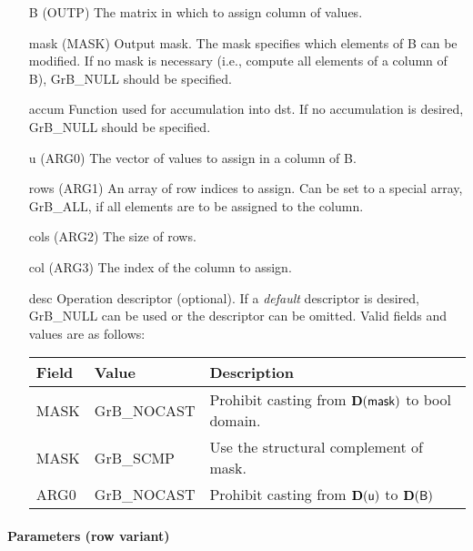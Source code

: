 \begin{itemize}[leftmargin=1.1in]
    \item[{\sf B}]   ({\sf OUTP}) The matrix in which to assign column of values.

    \item[{\sf mask}] ({\sf MASK}) Output mask. The mask specifies which elements
    of {\sf B} can be modified. If no mask is necessary (i.e., compute all
    elements of a column of {\sf B}), {\sf GrB\_NULL} should be specified.

    \item[{\sf accum}] Function used for accumulation into {\sf dst}.  If no accumulation
                        is desired, {\sf GrB\_NULL} should be specified.

    \item[{\sf u}]   ({\sf ARG0}) The vector of values to assign in a column of {\sf B}.

    \item[{\sf rows}]     ({\sf ARG1}) An array of row indices to assign. Can
                              be set to a special array, {\sf GrB\_ALL}, if all elements
                              are to be assigned to the column.
    \item[{\sf cols}]    ({\sf ARG2}) The size of {\sf rows}.
    \item[{\sf col}]     ({\sf ARG3}) The index of the column to assign.

    \item[{\sf desc}]   Operation descriptor (optional). If a
    \emph{default} descriptor is desired, {\sf GrB\_NULL} can be
    used or the descriptor can be omitted.  Valid fields and values are as follows: \\
    \begin{tabular}{lll}
    Field  & Value & Description \\
    \hline
    {\sf MASK} & {\sf GrB\_NOCAST} & Prohibit casting from $\bold{D}({\sf mask})$ to {\sf bool} domain. \\
    {\sf MASK} & {\sf GrB\_SCMP} & Use the structural complement of {\sf mask}. \\
    {\sf ARG0} & {\sf GrB\_NOCAST} & Prohibit casting from $\bold{D}({\sf u})$ to $\bold{D}({\sf B})$ \\
    \end{tabular}

\end{itemize}

\paragraph{Parameters (row variant)}

